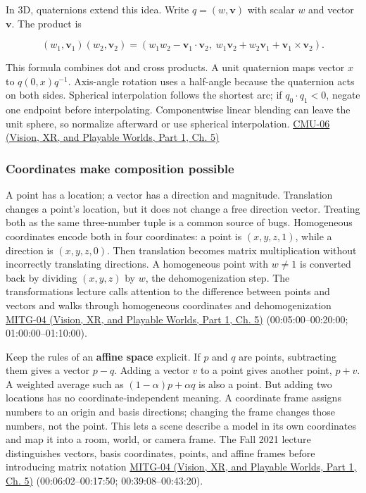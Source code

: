 In 3D, quaternions extend this idea. Write \(q=(w,\mathbf v)\) with scalar \(w\) and vector \(\mathbf v\). The product is

\[
(w_1,\mathbf v_1)(w_2,\mathbf v_2)=
(w_1w_2-\mathbf v_1\cdot\mathbf v_2,\;w_1\mathbf v_2+w_2\mathbf v_1+\mathbf v_1\times\mathbf v_2).
\]

This formula combines dot and cross products. A unit quaternion maps vector \(x\) to \(q(0,x)q^{-1}\). Axis-angle rotation uses a half-angle because the quaternion acts on both sides. Spherical interpolation follows the shortest arc; if \(q_0\cdot q_1<0\), negate one endpoint before interpolating. Componentwise linear blending can leave the unit sphere, so normalize afterward or use spherical interpolation. \href{../07-Vision-XR-and-Playable-Worlds-P01/main.pdf\#nameddest=04-visual-computing-ii-ch036-cmu-06---3d-rotations-and-complex-representations}{CMU-06 (Vision, XR, and Playable Worlds, Part 1, Ch. 5)}

\subsubsection{Coordinates make composition possible}\label{03-visual-computing-i-ch001-coordinates-make-composition-possible}

\hypertarget{03-visual-computing-i-ch001-coordinates-make-composition-possible}{}

A point has a location; a vector has a direction and magnitude. Translation changes a point's location, but it does not change a free direction vector. Treating both as the same three-number tuple is a common source of bugs. Homogeneous coordinates encode both in four coordinates: a point is \((x,y,z,1)\), while a direction is \((x,y,z,0)\). Then translation becomes matrix multiplication without incorrectly translating directions. A homogeneous point with \(w\ne 1\) is converted back by dividing \((x,y,z)\) by \(w\), the dehomogenization step. The transformations lecture calls attention to the difference between points and vectors and walks through homogeneous coordinates and dehomogenization \href{../07-Vision-XR-and-Playable-Worlds-P01/main.pdf\#nameddest=04-visual-computing-ii-ch036-mitg-04---transformations}{MITG-04 (Vision, XR, and Playable Worlds, Part 1, Ch. 5)} (00:05:00--00:20:00; 01:00:00--01:10:00).

Keep the rules of an \textbf{affine space} explicit. If \(p\) and \(q\) are points, subtracting them gives a vector \(p-q\). Adding a vector \(v\) to a point gives another point, \(p+v\). A weighted average such as \((1-\alpha)p+\alpha q\) is also a point. But adding two locations has no coordinate-independent meaning. A coordinate frame assigns numbers to an origin and basis directions; changing the frame changes those numbers, not the point. This lets a scene describe a model in its own coordinates and map it into a room, world, or camera frame. The Fall 2021 lecture distinguishes vectors, basis coordinates, points, and affine frames before introducing matrix notation \href{../07-Vision-XR-and-Playable-Worlds-P01/main.pdf\#nameddest=04-visual-computing-ii-ch036-mitg-04---transformations}{MITG-04 (Vision, XR, and Playable Worlds, Part 1, Ch. 5)} (00:06:02--00:17:50; 00:39:08--00:43:20).


